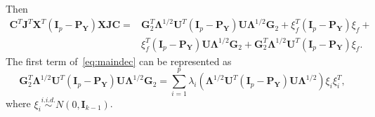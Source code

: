 \documentclass[12pt]{article} %
\newcommand{\bX}{\mathbf{X}}
\newcommand{\bP}{\mathbf{P}}
\newcommand{\bY}{\mathbf{Y}}
\newcommand{\bG}{\mathbf{G}}
\newcommand{\bJ}{\mathbf{J}}
\newcommand{\bC}{\mathbf{C}}
\newcommand{\bI}{\mathbf{I}}
\newcommand{\bU}{\mathbf{U}}
\newcommand{\bfsym}[1]{\ensuremath{\boldsymbol{#1}}}
\def\bLambda {\bfsym {\Lambda}}
\theoremstyle{definition}
\begin{document}
Then 
\begin{equation}\label{eq:maindec}
\begin{aligned}
\bC^T\bJ^T \bX^T(\bI_p-\bP_{\bY}) \bX\bJ\bC
=&
\bG_2^T \bLambda^{1/2}\bU^T (\bI_p-\bP_{\bY})\bU\bLambda^{1/2}\bG_2+
\xi_f^T (\bI_p -\bP_{\bY})\xi_f+\\
&\xi_f^T (\bI_p -\bP_{\bY})\bU\bLambda^{1/2}\bG_2+
\bG_2^T \bLambda^{1/2}\bU^T (\bI_p-\bP_{\bY})\xi_f.
\end{aligned}
\end{equation}
    The first term of~\eqref{eq:maindec} can be represented as
\begin{equation}\label{eq:firstTerm}
\bG_2^T \bLambda^{1/2}\bU^T (\bI_p-\bP_{\bY})\bU\bLambda^{1/2}\bG_2=
\sum_{i=1}^p \lambda_i (\bLambda^{1/2}\bU^T (\bI_p-\bP_{\bY})\bU\bLambda^{1/2})\xi_i \xi_i^T,
\end{equation}
where $\xi_i\overset{i.i.d.}{\sim} N(0,\bI_{k-1})$.
\end{document}
